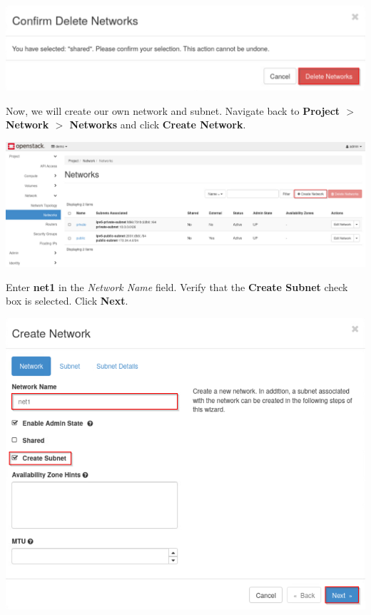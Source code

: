 \documentclass[letterpaper, 12pt]{article}
\begin{document}
\begin{enumerate}
\begin{labstep}
        \begin{center}
            \includegraphics[width=\linewidth]{images/part3/step6.png}
        \end{center}
    \end{labstep}

    \begin{labstep}
        Now, we will create our own network and subnet.
        Navigate back to \textbf{Project $>$ Network $>$ Networks} and click \textbf{Create Network}.

        \begin{center}
            \includegraphics[width=\linewidth]{images/part3/step7.png}
        \end{center}
    \end{labstep}

    \begin{labstep}
        Enter \textbf{net1} in the \textit{Network Name} field.
        Verify that the \textbf{Create Subnet} check box is selected.
        Click \textbf{Next}.

        \begin{center}
            \includegraphics[width=\linewidth]{images/part3/step8.png}
        \end{center}
    \end{labstep}


\end{enumerate}
\end{document}
